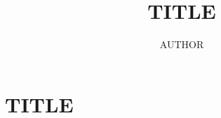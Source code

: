 \documentclass[a4paper,10pt,oneside,openright,
               oldfontcommands]{memoir}
\begin{document}
\title{%
  TITLE
}
\author{AUTHOR}

\maketitle

\begin{abstract}
  
\end{abstract}

\clearpage

\tableofcontents*

\chapter{TITLE}



\appendix


\printbibliography
\end{document}
